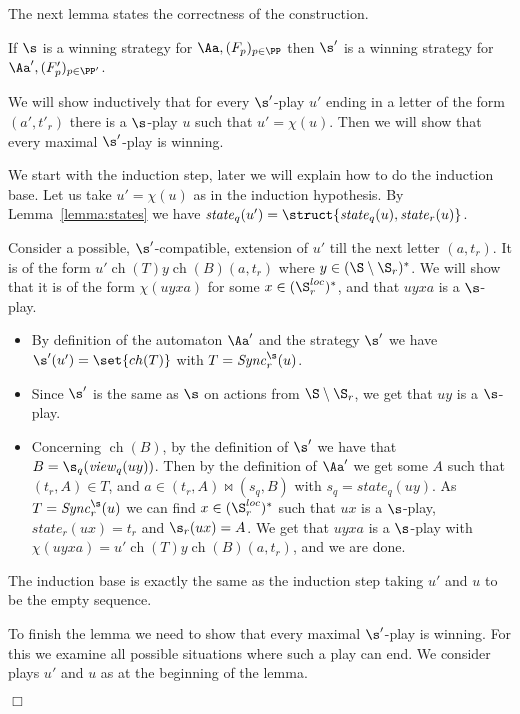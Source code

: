 \documentclass{llncs}
\newcommand{\Sync}{\mathit{Sync}}
\newcommand{\state}{\mathit{state}}
\newcommand{\view}{\mathit{view}}
\newcommand{\ch}{\mathop{ch}}
\renewenvironment{proof}{{\em Proof. }}{\nopagebreak
  \hspace*{\fill}$\Box$}
\begin{document}
The next lemma states the correctness of the construction. 



 \begin{lemma}\label{lemma:sigma to sigma prim}
  If $\s$ is a winning strategy for $\Aa,(F_p)_{p \in\PP}$ then $\s'$
  is a winning strategy for $\Aa',(F'_p)_{p \in \PP'}$.
\end{lemma}



\begin{proof}
  We will show inductively that for every $\s'$-play $u'$ ending 
  in a letter of the form $(a',t'_r)$ there is a $\s$-play
  $u$ such that $u'=\chi(u)$. Then we will show that
  every maximal $\s'$-play is winning.
  
  We start with the induction step, later we will explain how to
  do the induction base. Let us take $u'=\chi(u)$ as in the induction
  hypothesis. By Lemma~\ref{lemma:states} we have
  $\state_q(u')=\struct{\state_q(u),\state_r(u)}$.   

  Consider a possible, $\s'$-compatible, extension of $u'$ till the next letter
  $(a,t_r)$. It is of the form $u'\ch(T)y\ch(B)(a,t_r)$ where $y\in
  (\S \setminus \S_r)^*$.  We will show that it is of the form
  $\chi(uyxa)$ for some $x\in (\S_r^{loc})^*$,
  and that $uyxa$ is a $\s$-play.
  \begin{itemize}
  \item By definition of the automaton $\Aa'$ and the strategy $\s'$
    we have $\s'(u')=\set{\ch(T)}$ with $T=\Sync^\s_r(u)$.
  \item Since $\s'$ is the same as $\s$ on actions from $\S \setminus
    \S_r$, we get that $uy$ is a $\s$-play.

  \item Concerning $\ch(B)$, by the definition of $\s'$ we have that
    $B=\s_q(\view_q(uy))$. Then by the definition of $\Aa'$ we get
    some $A$ such that $(t_r,A)\in T$, and $a\in (t_r,A)\bowtie (s_q,B)$
    with $s_q=\state_q(uy)$. As $T=\Sync^\s_r(u)$ we can find $x\in
    (\S^{loc}_r)^*$ such that $ux$ is a $\s$-play, $\state_r(ux)=t_r$
    and $\s_r(ux)=A$. We get that $uyxa$ is a $\s$-play with
    $\chi(uyxa)=u'\ch(T)y\ch(B)(a,t_r)$, and we are done.
  \end{itemize}
The induction base is exactly the same as the induction step 
taking $u'$ and $u$ to be the empty sequence. 

To finish the lemma we need to show that every maximal $\s'$-play 
is winning. For this we examine all possible situations where
such a play can end. We consider plays $u'$ and $u$ as at the
beginning of the lemma.


\end{proof}
\end{document}
